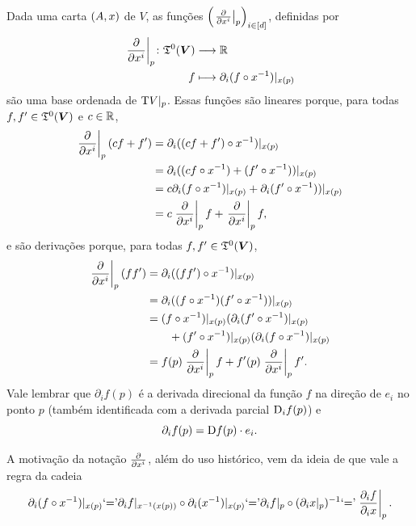 Dada uma carta $(A,x)$ de $V$, as funções $\left( \left.{\frac{\partial{}}{\partial{x^i}}}\right|_p \right)_{i \in [d]}$, definidas por
\begin{align*}
	{\left.{\frac{\partial{}}{\partial{x^i}}}\right|_p}\colon {\mathfrak{T}^0(\bm V)} &\longrightarrow {\mathbb{R}} \\{f} &\longmapsto \partial_i(f \circ x^{-1})|_{x(p)}
\end{align*}
são uma base ordenada de $\mathrm{T} V|_p$. Essas funções são lineares porque, para todas $f,f' \in \mathfrak{T}^0(\bm V)$ e $c \in \mathbb{R}$,
\begin{align*}
	\left.{\frac{\partial{}}{\partial{x^i}}}\right|_p(cf+f') &= \partial_i((cf+f') \circ x^{-1})|_{x(p)} \\
	&= \partial_i((cf \circ x^{-1}) + (f' \circ x^{-1}))|_{x(p)} \\
	&= c\partial_i(f \circ x^{-1})|_{x(p)} + \partial_i(f' \circ x^{-1}))|_{x(p)} \\
	&= c\left.{\frac{\partial{}}{\partial{x^i}}}\right|_p f + \left.{\frac{\partial{}}{\partial{x^i}}}\right|_p f,
\end{align*}
e são derivações porque, para todas $f,f' \in \mathfrak{T}^0(\bm V)$,
\begin{align*}
	\left.{\frac{\partial{}}{\partial{x^i}}}\right|_p(ff') &= \partial_i ((ff') \circ x^{-1})|_{x(p)} \\
	&= \partial_i ((f \circ x^{-1})(f' \circ x^{-1}))|_{x(p)} \\
	&= (f \circ x^{-1})|_{x(p)}(\partial_i (f' \circ x^{-1})|_{x(p)} \\
	&\qquad + (f' \circ x^{-1})|_{x(p)}(\partial_i (f \circ x^{-1})|_{x(p)} \\
	&= f(p)\left.{\frac{\partial{}}{\partial{x^i}}}\right|_p f +  f'(p)\left.{\frac{\partial{}}{\partial{x^i}}}\right|_p f'.
\end{align*}
Vale lembrar que $\partial_i f(p)$ é a derivada direcional da função $f$ na direção de $e_i$ no ponto $p$ (também identificada com a derivada parcial $\mathrm{D}_i f(p)$) e
\begin{equation*}
	\partial_i f(p) = \mathrm{D} f(p) \cdot e_i.
\end{equation*}

A motivação da notação $\frac{\partial{}}{\partial{x^i}}$, além do uso histórico, vem da ideia de que vale a regra da cadeia
\begin{align*}
	\partial_i(f \circ x^{-1})|_{x(p)} \text{`='} \partial_i f|_{x^{-1}(x(p))} \circ \partial_i(x^{-1})|_{x(p)} \text{`='} \partial_i f|_p \circ (\partial_i x|_p)^{-1} \text{`='} \left.\frac{\partial_i f}{\partial_i x}\right|_p.
\end{align*}

